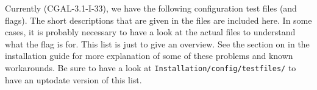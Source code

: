 
\noindent Currently (CGAL-3.1-I-33), we have the following configuration
test files (and flags). The short descriptions that are given in the files are 
included here. In some cases, it is probably necessary to have a look at the
actual files to understand what the flag is for. This list is just to
give an overview.  See the section on
 in the installation guide
for more explanation of some of these problems and known workarounds. 
Be sure to have a look at \texttt{Installation/config/testfiles/} to have an
uptodate version of this list.


